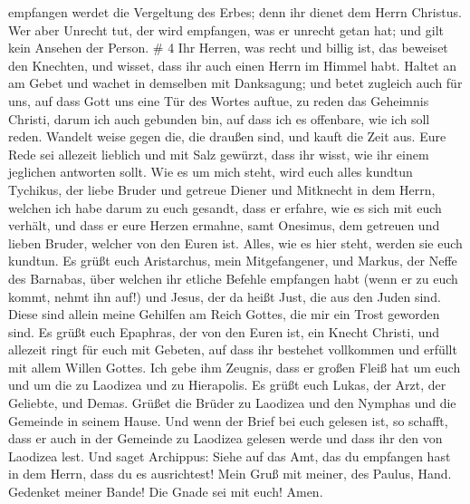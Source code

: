 empfangen werdet die Vergeltung des Erbes; denn ihr dienet dem Herrn
Christus.  Wer aber Unrecht tut, der wird empfangen, was er
unrecht getan hat; und gilt kein Ansehen der Person. \# 4 
Ihr Herren, was recht und billig ist, das beweiset den Knechten, und
wisset, dass ihr auch einen Herrn im Himmel habt.  Haltet an
am Gebet und wachet in demselben mit Danksagung;  und betet
zugleich auch für uns, auf dass Gott uns eine Tür des Wortes auftue, zu
reden das Geheimnis Christi, darum ich auch gebunden bin, 
auf dass ich es offenbare, wie ich soll reden.  Wandelt
weise gegen die, die draußen sind, und kauft die Zeit aus. 
Eure Rede sei allezeit lieblich und mit Salz gewürzt, dass ihr wisst,
wie ihr einem jeglichen antworten sollt.  Wie es um mich
steht, wird euch alles kundtun Tychikus, der liebe Bruder und getreue
Diener und Mitknecht in dem Herrn,  welchen ich habe darum
zu euch gesandt, dass er erfahre, wie es sich mit euch verhält, und dass
er eure Herzen ermahne,  samt Onesimus, dem getreuen und
lieben Bruder, welcher von den Euren ist. Alles, wie es hier steht,
werden sie euch kundtun.  Es grüßt euch Aristarchus, mein
Mitgefangener, und Markus, der Neffe des Barnabas, über welchen ihr
etliche Befehle empfangen habt (wenn er zu euch kommt, nehmt ihn auf!)
 und Jesus, der da heißt Just, die aus den Juden sind.
Diese sind allein meine Gehilfen am Reich Gottes, die mir ein Trost
geworden sind.  Es grüßt euch Epaphras, der von den Euren
ist, ein Knecht Christi, und allezeit ringt für euch mit Gebeten, auf
dass ihr bestehet vollkommen und erfüllt mit allem Willen Gottes.
 Ich gebe ihm Zeugnis, dass er großen Fleiß hat um euch und
um die zu Laodizea und zu Hierapolis.  Es grüßt euch Lukas,
der Arzt, der Geliebte, und Demas.  Grüßet die Brüder zu
Laodizea und den Nymphas und die Gemeinde in seinem Hause. 
Und wenn der Brief bei euch gelesen ist, so schafft, dass er auch in der
Gemeinde zu Laodizea gelesen werde und dass ihr den von Laodizea lest.
 Und saget Archippus: Siehe auf das Amt, das du empfangen
hast in dem Herrn, dass du es ausrichtest!  Mein Gruß mit
meiner, des Paulus, Hand. Gedenket meiner Bande! Die Gnade sei mit euch!
Amen.
